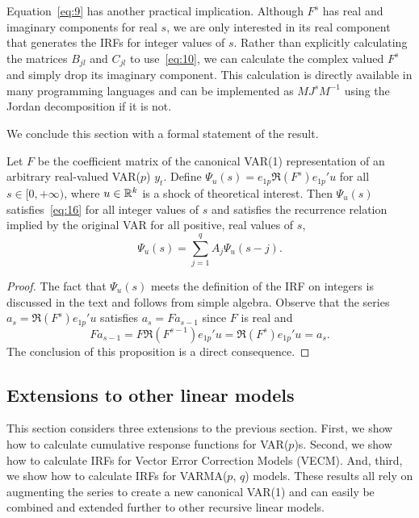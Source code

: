 \documentclass[12pt,fleqn]{article}
\begin{document}
Equation~\eqref{eq:9} has another practical implication. Although
$F^s$ has real and imaginary components for real $s$, we are only
interested in its real component that generates the IRFs for integer
values of $s$. Rather than explicitly calculating the matrices
$B_{jl}$ and $C_{jl}$ to use~\eqref{eq:10}, we can calculate the
complex valued $F^s$ and simply drop its imaginary component. This
calculation is directly available in many programming languages and
can be implemented as $M J^s M^{-1}$ using the Jordan decomposition if
it is not.

We conclude this section with a formal statement of the result.

\begin{proposition}
  \label{P1}
  Let $F$ be the coefficient matrix of the canonical VAR(1)
  representation of an arbitrary real-valued VAR($p$) $y_t$. Define
  $\Psi_{u}(s) = e_{1p} \Re(F^s) e_{1p}' u$ for all
  $s \in [0,+\infty)$, where $u \in \mathbb{R}^k$ is a shock of theoretical
  interest. Then $\Psi_{u}(s)$ satisfies~\eqref{eq:16} for all
  integer values of $s$ and satisfies the recurrence relation implied
  by the original VAR for all positive, real values of $s$,
  \begin{equation}
    \label{eq:11}
    \Psi_u(s) = \sum_{j=1}^q A_j \Psi_u(s-j).
  \end{equation}
\end{proposition}
\begin{proof}
  The fact that $\Psi_u(s)$ meets the definition of the IRF on
  integers is discussed in the text and follows from simple
  algebra. Observe that the series $a_s = \Re(F^s) e_{1p}'u$ satisfies
  $a_s = F a_{s-1}$ since $F$ is real and
  \[
    F a_{s-1} = F \Re(F^{s-1}) e_{1p}'u
    = \Re(F^s) e_{1p}'u
    = a_s.
  \]
  The conclusion of this proposition is a direct consequence.
\end{proof}

\subsection[Finite-order linear models]{Extensions to other linear models}
\label{S2.3}

This section considers three extensions to the previous section.
First, we show how to calculate cumulative response functions for
VAR($p$)s. Second, we show how to calculate IRFs for Vector Error
Correction Models (VECM). And, third, we show how to calculate IRFs
for VARMA($p$, $q$) models. These results all rely on augmenting the
series to create a new canonical VAR(1) and can easily be combined
and extended further to other recursive linear models.
\end{document}
